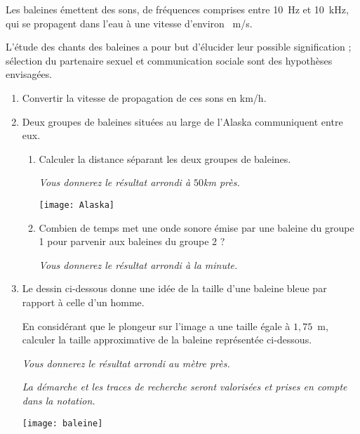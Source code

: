 
\medskip

Les baleines émettent des sons, de fréquences comprises entre 10~Hz et 10~kHz, qui se
propagent dans l'eau à une vitesse d'environ ~m/s.

L'étude des chants des baleines a pour but d'élucider leur possible signification ; sélection du partenaire sexuel et communication sociale sont des hypothèses envisagées.

\medskip

\begin{enumerate}
\item Convertir la vitesse de propagation de ces sons en km/h.
\item Deux groupes de baleines situées au large de l'Alaska communiquent entre eux.
	\begin{enumerate}
		\item Calculer la distance séparant les deux groupes de baleines. 
		
\emph{Vous donnerez le résultat arrondi à $50$km près.}

\begin{center}
\texttt{[image: Alaska]}
\end{center}

		\item Combien de temps met une onde sonore émise par une baleine du groupe 1 pour
parvenir aux baleines du groupe 2 ? 

\emph{Vous donnerez le résultat arrondi à la minute.}
 	\end{enumerate}
\item  Le dessin ci-dessous donne une idée de la taille d'une baleine bleue par rapport à celle d'un homme.
	
En considérant que le plongeur sur l'image a une taille égale à $1,75$~m, calculer la taille approximative de la baleine représentée ci-dessous. 
	
\emph{Vous donnerez le résultat arrondi au mètre près.}

\emph{La démarche et les traces de recherche seront valorisées et prises en compte dans la notation.}

\begin{center}
\texttt{[image: baleine]}
\end{center}
\end{enumerate}

\bigskip

